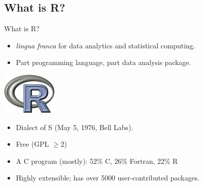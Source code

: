 \subsection{What is R?}
\makesubcontentsslidessec


\begin{frame}
  \begin{block}{What is R?}\pause
  \begin{minipage}{.675\textwidth}
  \begin{itemize}[<+-|alert@+>]
    \item \emph{lingua franca} for data analytics and statistical computing.
    \item Part programming language, part data analysis package.
  \end{itemize}
  \end{minipage}
  \hfill
  \begin{minipage}{.3\textwidth}
    \centering\includegraphics[scale=.85]{../common/pics/Rlogo}
  \end{minipage}
  \begin{itemize}
    \item Dialect of S (May 5, 1976, Bell Labs).
    \item Free (GPL $\geq 2$)
    \item A C program (mostly): 52\% C, 26\% Fortran, 22\% R
    \item Highly extensible; has over 5000 user-contributed packages.
  \end{itemize}
\end{block}
\end{frame}



